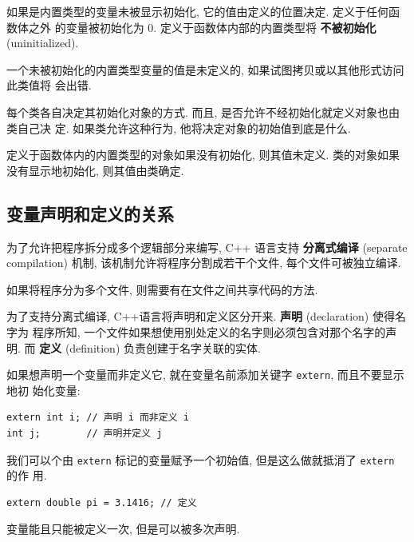 \documentclass[lang=cn]{elegantbook}
\begin{document}
\begin{enumerate}
如果是内置类型的变量未被显示初始化, 它的值由定义的位置决定. 定义于任何函数体之外
的变量被初始化为 0. 定义于函数体内部的内置类型将 \textbf{不被初始化} (uninitialized).

一个未被初始化的内置类型变量的值是未定义的, 如果试图拷贝或以其他形式访问此类值将
会出错.

每个类各自决定其初始化对象的方式. 而且, 是否允许不经初始化就定义对象也由类自己决
定. 如果类允许这种行为, 他将决定对象的初始值到底是什么.

\vspace*{1\baselineskip}
\begin{note}
定义于函数体内的内置类型的对象如果没有初始化, 则其值未定义. 类的对象如果没有显示地初始化, 则其值由类确定.
\end{note}
\end{enumerate}

\subsection{变量声明和定义的关系}
\label{sec:org2467baa}

为了允许把程序拆分成多个逻辑部分来编写, C++ 语言支持 \textbf{分离式编译} (separate
compilation) 机制, 该机制允许将程序分割成若干个文件, 每个文件可被独立编译.

如果将程序分为多个文件, 则需要有在文件之间共享代码的方法.

为了支持分离式编译, C++语言将声明和定义区分开来. \textbf{声明} (declaration) 使得名字为
程序所知, 一个文件如果想使用别处定义的名字则必须包含对那个名字的声明. 而 \textbf{定义}
(definition) 负责创建于名字关联的实体.

如果想声明一个变量而非定义它, 就在变量名前添加关键字 \texttt{extern}, 而且不要显示地初
始化变量:

\begin{verbatim}
extern int i; // 声明 i 而非定义 i
int j;        // 声明并定义 j
\end{verbatim}

我们可以个由 \texttt{extern} 标记的变量赋予一个初始值, 但是这么做就抵消了 \texttt{extern} 的作
用.

\begin{verbatim}
extern double pi = 3.1416; // 定义
\end{verbatim}

\vspace*{1\baselineskip}
\begin{note}
变量能且只能被定义一次, 但是可以被多次声明.
\end{note}
\end{document}
